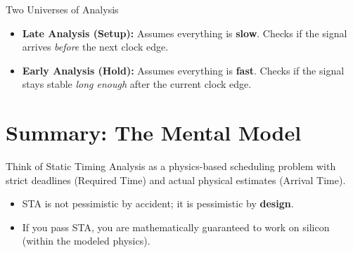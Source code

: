 \documentclass[11pt, a4paper]{article}
\begin{document}
\begin{mentalmodel}{Two Universes of Analysis}
\begin{itemize}
    \item \textbf{Late Analysis (Setup):} Assumes everything is \textbf{slow}. Checks if the signal arrives \textit{before} the next clock edge.
    \item \textbf{Early Analysis (Hold):} Assumes everything is \textbf{fast}. Checks if the signal stays stable \textit{long enough} after the current clock edge.
\end{itemize}
\end{mentalmodel}

\section{Summary: The Mental Model}

Think of Static Timing Analysis as a physics-based scheduling problem with strict deadlines (Required Time) and actual physical estimates (Arrival Time).

\begin{itemize}
    \item STA is not pessimistic by accident; it is pessimistic by \textbf{design}.
    \item If you pass STA, you are mathematically guaranteed to work on silicon (within the modeled physics).
\end{itemize}
\end{document}
